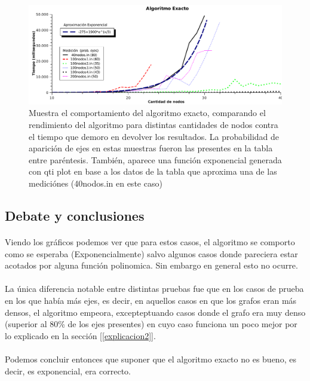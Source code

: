 \begin{figure}[h]
    \begin{minipage}{\textwidth}
	\begin{center}
		\includegraphics[width=\textwidth]{./otros/graficos/tiempo_ej2.pdf}
		\caption{Muestra el comportamiento del algoritmo exacto, comparando el rendimiento del algoritmo para distintas cantidades de nodos contra el tiempo que demoro en devolver los resultados. La probabilidad de aparición de ejes en estas muestras fueron las presentes en la tabla entre paréntesis. También, aparece una función exponencial generada con qti plot en base a los datos de la tabla que aproxima una de las mediciónes (40nodos.in en este caso)}
		\label{ej2contarTiempo}
	\end{center}
    \end{minipage}

\end{figure}

\clearpage

\subsection{Debate y conclusiones}
\paragraph{}
Viendo los gráficos podemos ver que para estos casos, el algoritmo se comporto como se esperaba (Exponencialmente) salvo algunos casos donde pareciera estar acotados por alguna función polinomica. Sin embargo en general esto no ocurre.

\paragraph{}
La única diferencia notable entre distintas pruebas fue que en los casos de prueba en los que había más ejes, es decir, en aquellos casos en que los grafos eran más densos, el algoritmo empeora, excepteptuando casos donde el grafo era muy denso (superior al 80\% de los ejes presentes) en cuyo caso funciona un poco mejor por lo explicado en la sección [\ref{explicacion2}].

\paragraph{}
Podemos concluir entonces que suponer que el algoritmo exacto no es bueno, es decir, es exponencial, era correcto.




